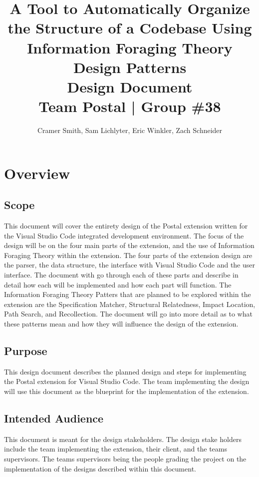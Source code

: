 \documentclass[letterpaper,10pt,titlepage,draftclsnofoot,onecolumn,onesided] {IEEEtran}
\def\doctitle{A Tool to Automatically Organize the Structure of a Codebase Using Information Foraging Theory Design Patterns}
\def\doctype{Design Document}
\def\team{Team Postal | Group \#38}
\begin{document}
\title{\Huge{\bfseries{\textsf{\doctitle}}}\\\textsf{\Large{\doctype}}\\\textsf{\large{\team}}}
\author{Cramer Smith, Sam Lichlyter, Eric Winkler, Zach Schneider}

\maketitle
\vfill
\vfill

\pagebreak

\tableofcontents

\pagebreak

\section{Overview}

\subsection{Scope}
This document will cover the entirety design of the Postal extension written for the Visual Studio Code integrated development environment. 
The focus of the design will be on the four main parts of the extension, and the use of Information Foraging Theory within the extension.
The four parts of the extension design are the parser, the data structure, the interface with Visual Studio Code and the user interface.
The document with go through each of these parts and describe in detail how each will be implemented and how each part will function.
The Information Foraging Theory Patters that are planned to be explored within the extension are the Specification Matcher, Structural Relatedness, Impact Location, Path Search, and Recollection.
The document will go into more detail as to what these patterns mean and how they will influence the design of the extension.

\subsection{Purpose}
This design document describes the planned design and steps for implementing the Postal extension for Visual Studio Code. 
The team implementing the design will use this document as the blueprint for the implementation of the extension. 

\subsection{Intended Audience}
This document is meant for the design stakeholders. 
The design stake holders include the team implementing the extension, their client, and the teams supervisors. 
The teams supervisors being the people grading the project on the implementation of the designs described within this document.
\end{document}
